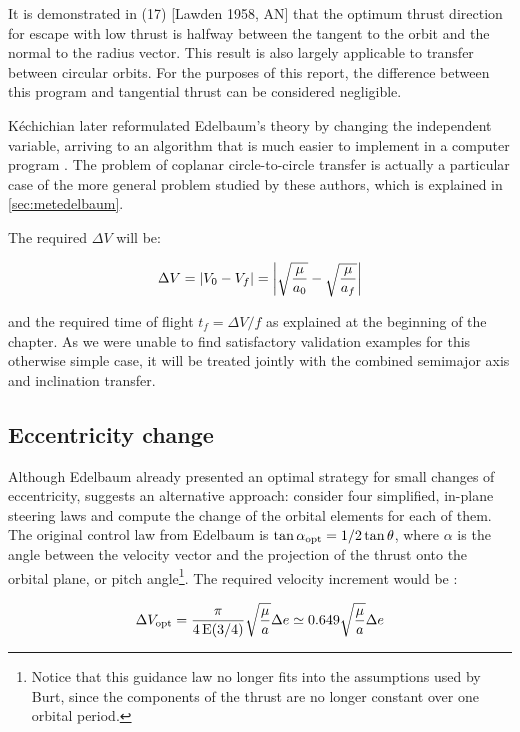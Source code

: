 \begin{displayquote}
It is demonstrated in (17) [Lawden 1958, AN] that the optimum thrust direction for escape with low thrust is halfway between the tangent to the orbit and the normal to the radius vector. This result is also largely applicable to transfer between circular orbits. For the purposes of this report, the difference between this program and tangential thrust can be considered negligible.
\end{displayquote}

Kéchichian later reformulated Edelbaum's theory by changing the independent variable, arriving to an algorithm that is much easier to implement in a computer program \cite{kechichian1997reformulation}. The problem of coplanar circle-to-circle transfer is actually a particular case of the more general problem studied by these authors, which is explained in \ref{sec:metedelbaum}.

The required $\Delta V$ will be:

\[
\Delta V = \left| V_0 - V_f \right| = \left| \sqrt{\frac{\mu}{a_0}} - \sqrt{\frac{\mu}{a_f}} \right|
\]

and the required time of flight $t_f = \Delta V / f$ as explained at the beginning of the chapter. As we were unable to find satisfactory validation examples for this otherwise simple case, it will be treated jointly with the combined semimajor axis and inclination transfer.

\subsection{Eccentricity change} \label{sec:metecc}

Although Edelbaum already presented an optimal strategy for small changes of eccentricity, \cite{pollard1997simplified} suggests an alternative approach: consider four simplified, in-plane steering laws and compute the change of the orbital elements for each of them. The original control law from Edelbaum is $\tan{\alpha_{\text{opt}} = 1/2} \tan{\ensuremath{\theta}}$, where $\alpha$ is the angle between the velocity vector and the projection of the thrust onto the orbital plane, or pitch angle\footnote{Notice that this guidance law no longer fits into the assumptions used by Burt, since the components of the thrust are no longer constant over one orbital period.}. The required velocity increment would be \cite{edelbaum1961propulsion}:

\[
\Delta V_{\text{opt}} = \frac{\pi}{4 \operatorname{E} (3/4)} \sqrt{\frac{\mu}{a}} \Delta e \simeq 0.649 \sqrt{\frac{\mu}{a}} \Delta e
\]

